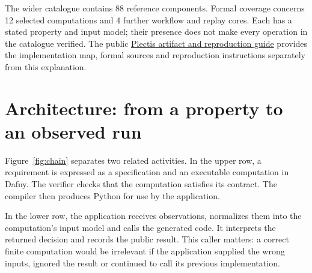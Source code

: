 \documentclass[11pt]{article}
\newcommand{\repourl}{https://github.com/wcook04/plectis}
\newcommand{\artifactguide}{\href{\repourl/blob/main/paper/README.md}{Plectis artifact and reproduction guide}}
\newcommand{\formalcomponentcount}{12}
\newcommand{\workflowcorecount}{4}
\begin{document}
The wider catalogue contains 88 reference components. Formal coverage concerns
\formalcomponentcount{} selected computations and \workflowcorecount{} further
workflow and replay cores. Each has a stated property and input model; their
presence does not make every operation in the catalogue verified. The public
\artifactguide{} provides the implementation map, formal sources and
reproduction instructions separately from this explanation.

\section{Architecture: from a property to an observed run}
\label{sec:architecture}
Figure~\ref{fig:chain} separates two related activities. In the upper row, a
requirement is expressed as a specification and an executable computation in
Dafny. The verifier checks that the computation satisfies its contract. The
compiler then produces Python for use by the application.

In the lower row, the application receives observations, normalizes them into
the computation's input model and calls the generated code. It interprets the
returned decision and records the public result. This caller matters: a correct
finite computation would be irrelevant if the application supplied the wrong
inputs, ignored the result or continued to call its previous implementation.
\end{document}
